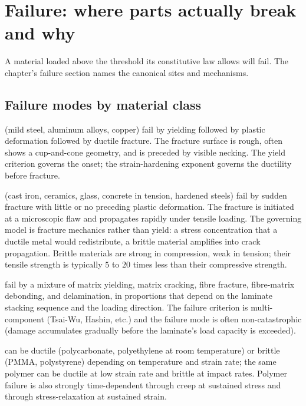 \section{Failure: where parts actually break and why}

A material loaded above the threshold its constitutive law allows
will fail. The chapter's failure section names the canonical sites
and mechanisms.

\subsection{Failure modes by material class}

 (mild steel, aluminum alloys, copper) fail
by yielding followed by plastic deformation followed by ductile
fracture. The fracture surface is rough, often shows a cup-and-cone
geometry, and is preceded by visible necking. The yield criterion
governs the onset; the strain-hardening exponent governs the
ductility before fracture.

 (cast iron, ceramics, glass, concrete in
tension, hardened steels) fail by sudden fracture with little or no
preceding plastic deformation. The fracture is initiated at a
microscopic flaw and propagates rapidly under tensile loading. The
governing model is fracture mechanics rather than yield: a stress
concentration that a ductile metal would redistribute, a brittle
material amplifies into crack propagation. Brittle materials are
strong in compression, weak in tension; their tensile strength is
typically $5$ to $20$ times less than their compressive strength.

 fail by a mixture of matrix yielding, matrix
cracking, fibre fracture, fibre-matrix debonding, and delamination,
in proportions that depend on the laminate stacking sequence and
the loading direction. The failure criterion is multi-component
(Tsai-Wu, Hashin, etc.) and the failure mode is often non-catastrophic
(damage accumulates gradually before the laminate's load capacity is
exceeded).

 can be ductile (polycarbonate, polyethylene at
room temperature) or brittle (PMMA, polystyrene) depending on
temperature and strain rate; the same polymer can be ductile at low
strain rate and brittle at impact rates. Polymer failure is also
strongly time-dependent through creep at sustained stress and
through stress-relaxation at sustained strain.

